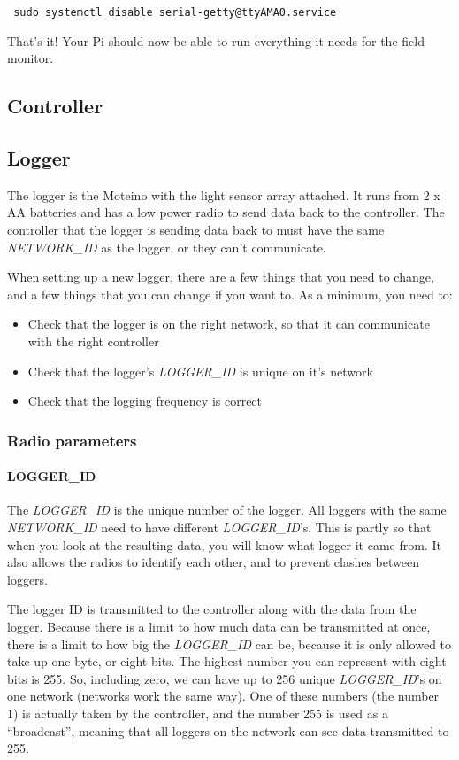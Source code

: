 \documentclass[10pt]{article}
\begin{document}
\begin{verbatim}
 sudo systemctl disable serial-getty@ttyAMA0.service
\end{verbatim}

That's it! Your Pi should now be able to run everything it needs for the field monitor.

\subsection{Controller}

\subsection{Logger}
The logger is the Moteino with the light sensor array attached. It runs from 2 x AA batteries and has a low power radio to send data back to the controller. The controller
that the logger is sending data back to must have the same \textit{NETWORK\_ID} as the logger, or they can't communicate.

When setting up a new logger, there are a few things that you need to change, and a few things that you can change if you want to. As a minimum, you need to:

\begin{itemize}
 \item Check that the logger is on the right network, so that it can communicate with the right controller
 \item Check that the logger's \textit{LOGGER\_ID} is unique on it's network
 \item Check that the logging frequency is correct
\end{itemize}


\subsubsection{Radio parameters}

\paragraph{LOGGER\_ID}
The \textit{LOGGER\_ID} is the unique number of the logger. All loggers with the same \textit{NETWORK\_ID} need to have different \textit{LOGGER\_ID}'s. This is partly so 
that when you look at the resulting data, you will know what logger it came from. It also allows the radios to identify each other, and to prevent clashes between 
loggers. 

The logger ID is transmitted to the controller along with the data from the logger. Because there is a limit to how much data can be transmitted at once, there is a limit
to how big the \textit{LOGGER\_ID} can be, because it is only allowed to take up one byte, or eight bits. The highest number you can represent with eight bits is 255. So,
including zero, we can have up to 256 unique \textit{LOGGER\_ID}'s on one network (networks work the same way). One of these numbers (the number 1) is actually taken by
the controller, and the number 255 is used as a ``broadcast'', meaning that all loggers on the network can see data transmitted to 255. 
\end{document}
